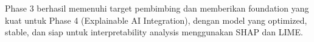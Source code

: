 Phase 3 berhasil memenuhi target pembimbing dan memberikan foundation yang kuat untuk Phase 4 (Explainable AI Integration), dengan model yang optimized, stable, dan siap untuk interpretability analysis menggunakan SHAP dan LIME.

